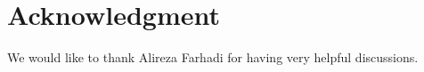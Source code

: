 \section{Acknowledgment}
We would like to thank Alireza Farhadi for having very helpful discussions.